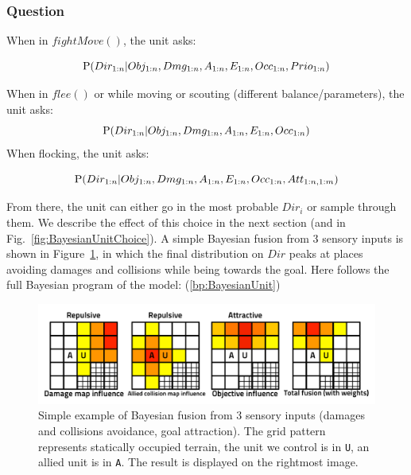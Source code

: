 \subsubsection{Question}

When in $fightMove()$, the unit asks:
\begin{small}
$$\mathrm{P}(Dir_{1:n} \mathbf{|} Obj_{1:n}, Dmg_{1:n}, A_{1:n}, E_{1:n}, Occ_{1:n}, Prio_{1:n})$$
\end{small}
When in $flee()$ or while moving or scouting (different balance/parameters), the unit asks:
$$\mathrm{P}(Dir_{1:n} \mathbf{|} Obj_{1:n}, Dmg_{1:n}, A_{1:n}, E_{1:n}, Occ_{1:n})$$
When flocking, the unit asks:
\begin{small}
$$\mathrm{P}(Dir_{1:n} \mathbf{|} Obj_{1:n}, Dmg_{1:n}, A_{1:n}, E_{1:n}, Occ_{1:n}, Att_{1:n,1:m}) $$
\end{small}
From there, the unit can either go in the most probable $Dir_i$ or sample through them. We describe the effect of this choice in the next section (and in Fig.~\ref{fig:BayesianUnitChoice}). A simple Bayesian fusion from 3 sensory inputs is shown in Figure~\ref{fig:BayesianUnitExample}, in which the final distribution on $Dir$ peaks at places avoiding damages and collisions while being towards the goal. Here follows the full Bayesian program of the model: (\ref{bp:BayesianUnit})

\begin{figure}[!ht]
\begin{center}
\includegraphics[width=13cm]{images/example_BayesianUnit.pdf}
\end{center}
\caption{Simple example of Bayesian fusion from 3 sensory inputs (damages and collisions avoidance, goal attraction). The grid pattern represents statically occupied terrain, the unit we control is in \texttt{U}, an allied unit is in \texttt{A}. The result is displayed on the rightmost image.}
\label{fig:BayesianUnitExample}
\end{figure}

